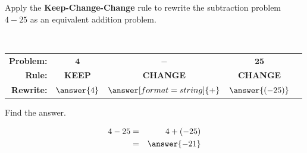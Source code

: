 \documentclass{ximera}[font=12pt]
\begin{document}
\begin{problem}
    Apply the \textbf{Keep-Change-Change} rule to rewrite the subtraction problem $4 -25$ as an equivalent 
    addition problem.  

    ~ \\[2em]
    \begin{center}
    \renewcommand{\arraystretch}{2} %
    \begin{tabular}{rcccl}
        \textbf{Problem:} & \Large $\mathbf{4}$ & \Huge $\mathbf{-}$ & \Large $\mathbf{25}$ & \\
        \textbf{Rule:}     & \textcolor{OliveGreen!90!black}{\textbf{KEEP}} & \textcolor{orange!80!black}{\textbf{CHANGE}} & 
        \textcolor{orange!80!black}{\textbf{CHANGE}} & \\
        \textbf{Rewrite:}  &  $\answer{4}$ &  $\answer[format=string]{+}$ & $\answer{(-25)}$ &
    \end{tabular}
    \end{center}
                                                                
    \begin{problem}
    Find the answer.                                                        

    \begin{eqnarray*}
       4 - 25 &=& 4 + (-25) \\ 
                &=& \answer{-21} 
    \end{eqnarray*}   
 
\end{problem}
\end{problem}

\end{document}
